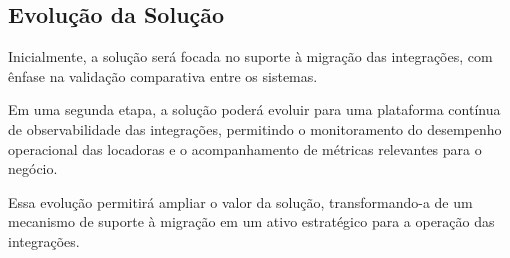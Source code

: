 \subsection{Evolução da Solução}

Inicialmente, a solução será focada no suporte à migração das integrações, com ênfase na validação comparativa entre os sistemas.

Em uma segunda etapa, a solução poderá evoluir para uma plataforma contínua de observabilidade das integrações, permitindo o monitoramento do desempenho operacional das locadoras e o acompanhamento de métricas relevantes para o negócio.

Essa evolução permitirá ampliar o valor da solução, transformando-a de um mecanismo de suporte à migração em um ativo estratégico para a operação das integrações.

